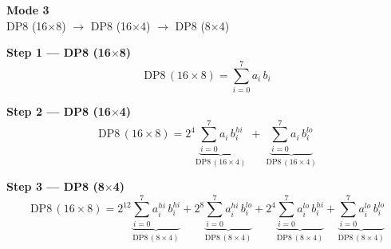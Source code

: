 \documentclass[fleqn]{article}
\newcommand{\DPop}[3]{\mathrm{DP#1}\,(#2\!\times\!#3)}
\begin{document}
\begin{center}
{\LARGE \textbf{Mode 3}}\\[4pt]
{\large DP8 (16$\times$8) $\rightarrow$ DP8 (16$\times$4) $\rightarrow$ DP8 (8$\times$4)}
\end{center}

\vspace{4em}

\noindent\textbf{Step 1 --- DP8 (16$\times$8)}
\[
\DPop{8}{16}{8} = \sum_{i=0}^{7} a_i \, b_i
\]

\vspace{0.5em}

\noindent\textbf{Step 2 --- DP8 (16$\times$4)}
\[
\DPop{8}{16}{8}
  = 2^{4} \underbrace{\sum_{i=0}^{7} a_i \, b_i^{hi}}_{\DPop{8}{16}{4}}
  \; + \; \underbrace{\sum_{i=0}^{7} a_i \, b_i^{lo}}_{\DPop{8}{16}{4}}
\]

\vspace{0.5em}

\noindent\textbf{Step 3 --- DP8 (8$\times$4)}
\[
\DPop{8}{16}{8}
  = 2^{12} \underbrace{\sum_{i=0}^{7} a_i^{hi} \, b_i^{hi}}_{\DPop{8}{8}{4}}
  + 2^{8} \underbrace{\sum_{i=0}^{7} a_i^{hi} \, b_i^{lo}}_{\DPop{8}{8}{4}}
  + 2^{4} \underbrace{\sum_{i=0}^{7} a_i^{lo} \, b_i^{hi}}_{\DPop{8}{8}{4}}
  + \underbrace{\sum_{i=0}^{7} a_i^{lo} \, b_i^{lo}}_{\DPop{8}{8}{4}}
\]
\end{document}
